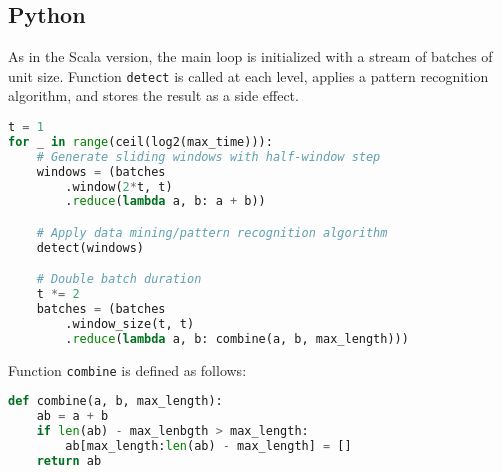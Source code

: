 \documentclass[runningheads,a4paper]{llncs}
\begin{document}
\clearpage
\subsection*{Python}


As in the Scala version, the main loop is initialized with a stream
of batches of unit size.  Function \texttt{detect} is called at
each level, applies a pattern recognition algorithm, and
stores the result as a side effect.

\begin{lstlisting}[language=python, style=pythonstyle]
t = 1
for _ in range(ceil(log2(max_time))):
    # Generate sliding windows with half-window step
    windows = (batches
        .window(2*t, t)
        .reduce(lambda a, b: a + b))

    # Apply data mining/pattern recognition algorithm
    detect(windows)

    # Double batch duration
    t *= 2
    batches = (batches
        .window_size(t, t)
        .reduce(lambda a, b: combine(a, b, max_length)))
\end{lstlisting}

Function \texttt{combine} is defined as follows:

\begin{lstlisting}[language=python, style=pythonstyle]
def combine(a, b, max_length):
    ab = a + b
    if len(ab) - max_lenbgth > max_length:
        ab[max_length:len(ab) - max_length] = []
    return ab
\end{lstlisting}
\end{document}
